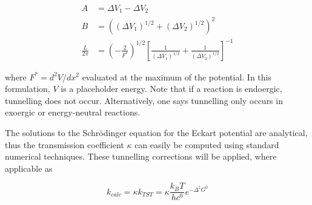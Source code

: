 \begin{align}
  A &= \Delta V_1 - \Delta V_2 \\
  B &= ((\Delta V_1)^{1/2} + (\Delta V_2)^{1/2})^2 \\
 \frac{L}{2\pi} &= (-\frac{2}{F^*})^{1/2} [\frac{1}{(\Delta V_1)^{1/2}} +
      \frac{1}{(\Delta V_2)^{1/2}}]^{-1}
\end{align}

\noindent where $F^* = d^2V/dx^2$ evaluated at the maximum of the potential. In
this formulation, $V$ is a placeholder energy. Note that if a reaction is
endoergic, tunnelling does not occur. Alternatively, one says tunnelling only
occurs in exoergic or energy-neutral reactions.

The solutions to the Schr{\"o}dinger equation for the Eckart potential are
analytical, thus the transmission coefficient $\kappa$ can easily be computed
using standard numerical techniques. These tunnelling corrections will be
applied, where applicable as

\begin{equation}
  k_{calc} = \kappa k_{TST} = \kappa
\frac{k_B T}{hc^0}e^{-\Delta^\ddagger G^0}
\end{equation}
